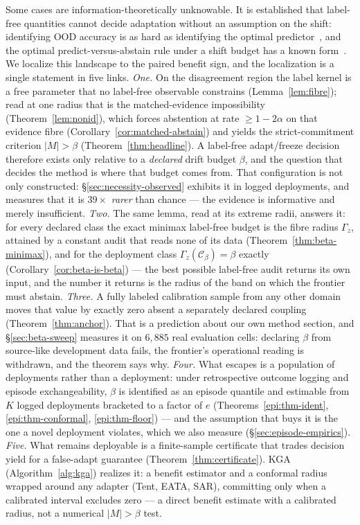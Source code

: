 Some cases are information-theoretically unknowable. It is established that label-free
quantities cannot decide adaptation without an assumption on the shift: identifying OOD
accuracy is as hard as identifying the optimal predictor~\cite{garg2022atc}, and the optimal
predict-versus-abstain rule under a shift budget has a known form~\cite{kalai2021abstain}. We
localize this landscape to the paired benefit sign, and the localization is a single statement in
five links. \emph{One.} On the disagreement region the label kernel is a free parameter that no
label-free observable constrains (Lemma~\ref{lem:fibre}); read at one radius that is the
matched-evidence impossibility (Theorem~\ref{lem:nonid}), which forces abstention at rate
$\ge1-2\alpha$ on that evidence fibre (Corollary~\ref{cor:matched-abstain}) and yields the
strict-commitment criterion $|M|>\beta$ (Theorem~\ref{thm:headline}). A label-free adapt/freeze
decision therefore exists only relative to a \emph{declared} drift budget $\beta$, and the question
that decides the method is where that budget comes from. That configuration is not only
constructed: \S\ref{sec:necessity-observed} exhibits it in logged deployments, and measures that it
is $39\times$ \emph{rarer} than chance --- the evidence is informative and merely insufficient.
\emph{Two.} The same lemma, read at its
extreme radii, answers it: for every declared class the exact minimax label-free budget is the fibre
radius $\Gamma_z$, attained by a constant audit that reads none of its data
(Theorem~\ref{thm:beta-minimax}), and for the deployment class $\Gamma_z(\mathcal C_\beta)=\beta$
exactly (Corollary~\ref{cor:beta-is-beta}) --- the best possible label-free audit returns its own
input, and the number it returns is the radius of the band on which the frontier must abstain.
\emph{Three.} A fully labeled calibration sample from any other domain moves that value by exactly
zero absent a separately declared coupling (Theorem~\ref{thm:anchor}). That is a prediction about
our own method section, and \S\ref{sec:beta-sweep} measures it on $6{,}885$ real evaluation cells:
declaring $\beta$ from source-like development data fails, the frontier's operational reading is
withdrawn, and the theorem says why. \emph{Four.} What escapes is a population of deployments rather
than a deployment: under retrospective outcome logging and episode exchangeability, $\beta$ is
identified as an episode quantile and estimable from $K$ logged deployments bracketed to a factor of
$e$ (Theorems~\ref{epi:thm-ident}, \ref{epi:thm-conformal}, \ref{epi:thm-floor}) --- and the
assumption that buys it is the one a novel deployment violates, which we also measure
(\S\ref{sec:episode-empirics}). \emph{Five.} What remains deployable is a finite-sample certificate
that trades decision yield for a false-adapt guarantee (Theorem~\ref{thm:certificate}). \textsc{KGA}
(Algorithm~\ref{alg:kga}) realizes it: a benefit estimator and a conformal radius wrapped around any
adapter (Tent, EATA, SAR), committing only when a calibrated interval excludes zero --- a direct
benefit estimate with a calibrated radius, not a numerical $|M|{>}\beta$ test.

